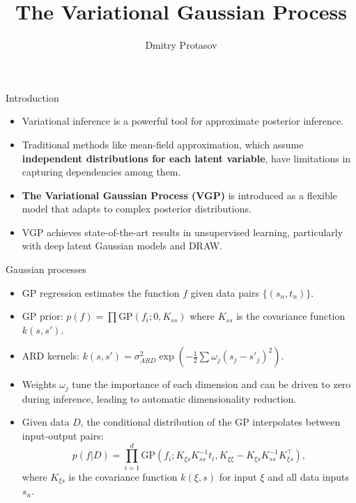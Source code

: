 \documentclass{beamer}
\title{The Variational Gaussian Process}
\author{Dmitry Protasov}
\institute{MIPT}
\begin{document}
\begin{frame}
    \titlepage
\end{frame}

\begin{frame}{Introduction}
    \begin{itemize}
        \item Variational inference is a powerful tool for approximate posterior inference.
        \item Traditional methods like mean-field approximation, which assume \textbf{independent distributions for each latent variable}, have limitations in capturing dependencies among them.
        \item \textbf{The Variational Gaussian Process (VGP)} is introduced as a flexible model that adapts to complex posterior distributions.
        \item VGP achieves state-of-the-art results in unsupervised learning, particularly with deep latent Gaussian models and DRAW.
    \end{itemize}
\end{frame}

\begin{frame}{Gaussian processes}
    \begin{itemize}
        \item GP regression estimates the function $f$ given data pairs $\{(s_n, t_n)\}$.
        \item GP prior: $p(f) = \prod \text{GP}(f_i; 0, K_{ss})$ where $K_{ss}$ is the covariance function $k(s, s')$.
        \item ARD kernels: $k(s, s') = \sigma^2_{ARD} \exp\left(-\frac{1}{2} \sum \omega_j (s_j - s'_j)^2\right)$.
        \item Weights $\omega_j$ tune the importance of each dimension and can be driven to zero during inference, leading to automatic dimensionality reduction.
        \item Given data $D$, the conditional distribution of the GP interpolates between input-output pairs:
        \[
        p(f | D) = \prod_{i=1}^d \text{GP}\left(f_i; K_{\xi s} K_{ss}^{-1} t_i, K_{\xi \xi} - K_{\xi s} K_{ss}^{-1} K_{\xi s}^\top\right),
        \]
        where $K_{\xi s}$ is the covariance function $k(\xi, s)$ for input $\xi$ and all data inputs $s_n$.
    \end{itemize}
\end{frame}
\end{document}
